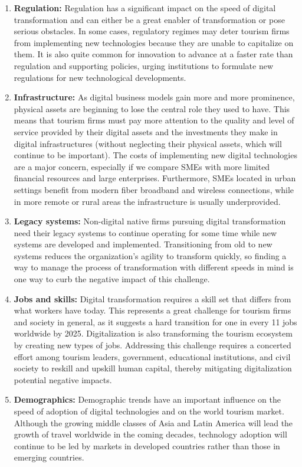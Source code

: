 \documentclass[
  letterpaper,
  DIV=11,
  numbers=noendperiod]{scrreprt}
\begin{document}
\begin{enumerate}
\def\labelenumi{\arabic{enumi}.}
\item
  \textbf{Regulation:} Regulation has a significant impact on the speed
  of digital transformation and can either be a great enabler of
  transformation or pose serious obstacles. In some cases, regulatory
  regimes may deter tourism firms from implementing new technologies
  because they are unable to capitalize on them. It is also quite common
  for innovation to advance at a faster rate than regulation and
  supporting policies, urging institutions to formulate new regulations
  for new technological developments.
\item
  \textbf{Infrastructure:} As digital business models gain more and more
  prominence, physical assets are beginning to lose the central role
  they used to have. This means that tourism firms must pay more
  attention to the quality and level of service provided by their
  digital assets and the investments they make in digital
  infrastructures (without neglecting their physical assets, which will
  continue to be important). The costs of implementing new digital
  technologies are a major concern, especially if we compare SMEs with
  more limited financial resources and large enterprises. Furthermore,
  SMEs located in urban settings benefit from modern fiber broadband and
  wireless connections, while in more remote or rural areas the
  infrastructure is usually underprovided.
\item
  \textbf{Legacy systems:} Non-digital native firms pursuing digital
  transformation need their legacy systems to continue operating for
  some time while new systems are developed and implemented.
  Transitioning from old to new systems reduces the organization's
  agility to transform quickly, so finding a way to manage the process
  of transformation with different speeds in mind is one way to curb the
  negative impact of this challenge.
\item
  \textbf{Jobs and skills:} Digital transformation requires a skill set
  that differs from what workers have today. This represents a great
  challenge for tourism firms and society in general, as it suggests a
  hard transition for one in every 11 jobs worldwide by 2025.
  Digitalization is also transforming the tourism ecosystem by creating
  new types of jobs. Addressing this challenge requires a concerted
  effort among tourism leaders, government, educational institutions,
  and civil society to reskill and upskill human capital, thereby
  mitigating digitalization potential negative impacts.
\item
  \textbf{Demographics:} Demographic trends have an important influence
  on the speed of adoption of digital technologies and on the world
  tourism market. Although the growing middle classes of Asia and Latin
  America will lead the growth of travel worldwide in the coming
  decades, technology adoption will continue to be led by markets in
  developed countries rather than those in emerging countries.
\end{enumerate}
\end{document}
